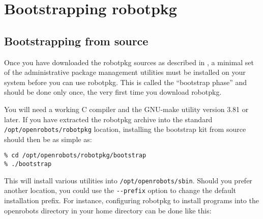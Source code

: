 %
%
%
%
%

\section{Bootstrapping robotpkg} %

\subsection{Bootstrapping from source} %

Once    you    have downloaded  the     robotpkg    sources  as  described   in
, a   minimal  set of   the
administrative  package management utilities must   be installed on your system
before you can use robotpkg.  This is called the ``bootstrap phase'' and should
be done only once, the very first time you download robotpkg.

You will  need a working C compiler  and the GNU-make   utility version 3.81 or
later.    If you have  extracted  the  robotpkg  archive  into  the standard {\tt
/opt/openrobots/robotpkg} location, installing the   bootstrap kit from  source
should then be as simple as:

\begin{verbatim}
% cd /opt/openrobots/robotpkg/bootstrap
% ./bootstrap
\end{verbatim}

This will  install various utilities   into {\tt /opt/openrobots/sbin}.  Should
you prefer another   location, you could  use the  {\tt -{}-prefix}  option  to
change the default installation  prefix.  For instance, configuring robotpkg to
install programs  into the openrobots directory  in your home directory  can be
done like this:

